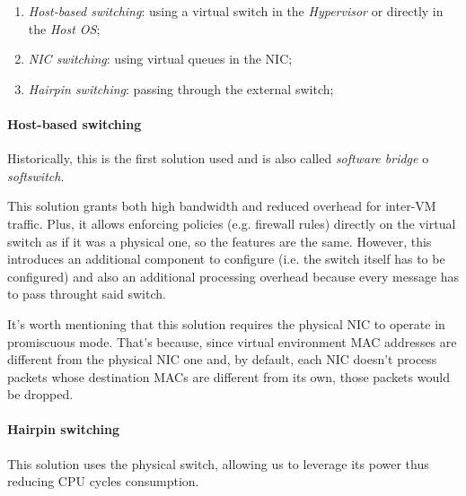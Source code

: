 \noindent
\begin{minipage}{0.48\textwidth}
\begin{enumerate}
    \item \emph{Host-based switching}: using a virtual switch in the
    \emph{Hypervisor} or directly in the \emph{Host OS};
    \item \emph{NIC switching}: using virtual queues in the NIC;
    \item \emph{Hairpin switching}: passing through the external switch;
\end{enumerate}
\end{minipage}
\hfill
\begin{minipage}{0.48\textwidth}
    \centering
\end{minipage}

\paragraph{Host-based switching}
Historically, this is the first solution used and is also called \emph{software
bridge} o \emph{softswitch}.

\bigskip\noindent
\begin{minipage}{0.48\textwidth}
    This solution grants both high bandwidth and reduced overhead for inter-VM
    traffic. Plus, it allows enforcing policies (e.g. firewall rules) directly
    on the virtual switch as if it was a physical one, so the features are the
    same. However, this introduces an additional component to configure (i.e. the
    switch itself has to be configured) and also an additional processing
    overhead because every message has to pass throught said switch.
\end{minipage}
\hfill
\begin{minipage}{0.48\textwidth}
    \centering
\end{minipage}

\bigskip\noindent
It's worth mentioning that this solution requires the physical NIC to operate in
promiscuous mode. That's because, since virtual environment MAC addresses are
different from the physical NIC one and, by default, each NIC doesn't process
packets whose destination MACs are different from its own, those packets would
be dropped.

\paragraph{Hairpin switching}
This solution uses the physical switch, allowing us to leverage its power thus
reducing CPU cycles consumption.

